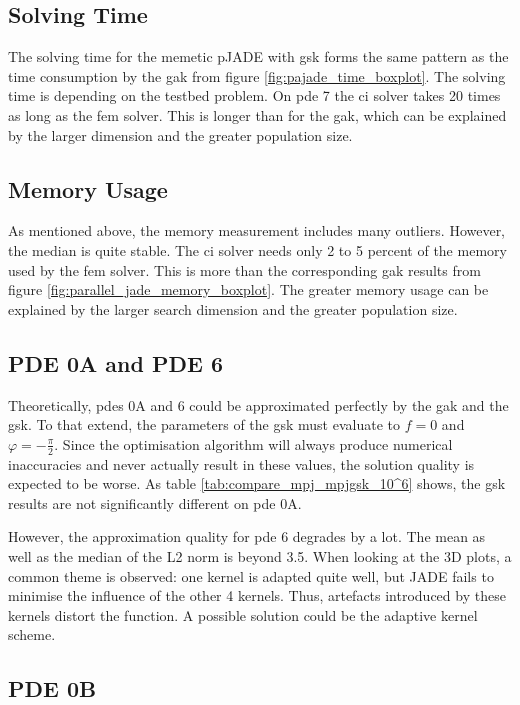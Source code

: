 \documentclass[./\jobname.tex]{subfiles}
\begin{document}
\subsection{Solving Time}
The solving time for the memetic pJADE with \gls{gsk} forms the same pattern as the time consumption by the \gls{gak} from figure \ref{fig:pajade_time_boxplot}. The solving time is depending on the testbed problem. On \gls{pde} 7 the \gls{ci} solver takes 20 times as long as the \gls{fem} solver. This is longer than for the \gls{gak}, which can be explained by the larger dimension and the greater population size.  

\subsection{Memory Usage}

As mentioned above, the memory measurement includes many outliers. However, the median is quite stable. The \gls{ci} solver needs only 2 to 5 percent of the memory used by the \gls{fem} solver. This is more than the corresponding \gls{gak} results from figure \ref{fig:parallel_jade_memory_boxplot}. The greater memory usage can be explained by the larger search dimension and the greater population size. 

\subsection{PDE 0A and PDE 6}

Theoretically, \gls{pde}s 0A and 6 could be approximated perfectly by the \gls{gak} and the \gls{gsk}. To that extend, the parameters of the \gls{gsk} must evaluate to $f=0$ and $\varphi=-\frac{\pi}{2}$. Since the optimisation algorithm will always produce numerical inaccuracies and never actually result in these values, the solution quality is expected to be worse. As table \ref{tab:compare_mpj_mpjgsk_10^6} shows, the \gls{gsk} results are not significantly different on \gls{pde} 0A. 

However, the approximation quality for \gls{pde} 6 degrades by a lot. The mean as well as the median of the L2 norm is beyond 3.5. When looking at the 3D plots, a common theme is observed: one kernel is adapted quite well, but JADE fails to minimise the influence of the other 4 kernels. Thus, artefacts introduced by these kernels distort the function. A possible solution could be the adaptive kernel scheme. 


\subsection{PDE 0B}
\end{document}
